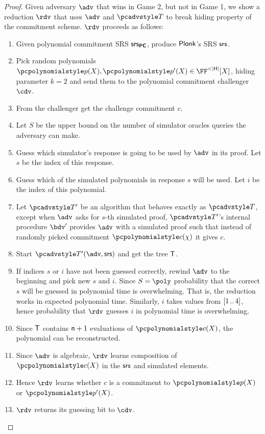 \documentclass[runningheads,11pt]{llncs}
\begin{document}
\begin{proof}
   Given adversary $\adv$ that wins in Game
  2, but not in Game 1, we show a reduction $\rdv$ that uses $\adv$ and $\tdv$
  to break hiding property  of the commitment scheme. $\rdv$ proceeds as follows:
  \begin{enumerate}
  \item Given polynomial commitment SRS $\mathsf{srs}_{\bm{\mathsf{PC}}}$, produce $\textnormal{\textsf{Plonk}}$'s SRS
    $\mathsf{srs}$.
  \item Pick random polynomials $\p{p} (X), \p{p'} (X) \in \FF^{< |\HHH|} [X]$,
    hiding parameter $k = 2$ and send them to the polynomial commitment
    challenger $\cdv$.
  \item From the challenger get the challenge commitment $c$.
  \item Let $S$ be the upper bound on the number of simulator oracles queries
    the adversary can make. 
  \item Guess which simulator's response is going to be used by $\adv$ in its
    proof. Let $s$ be the index of this response.
  \item Guess which of the simulated polynomials in response $s$ will be
    used. Let $i$ be the index of this polynomial.
  \item Let $\tdv'$ be an algorithm that behaves exactly as $\tdv$, except when
    $\adv$ asks for $s$-th simulated proof, $\tdv'$'s internal procedure $\bdv'$
    provides $\adv$ with a simulated proof such that instead of randomly picked
    commitment $\p{c} (\chi)$ it gives $c$.
  \item Start $\tdv'(\adv, \srs)$ and get the tree $\mathsf{T}$.
  \item If indices $s$ or $i$ have not been guessed correctly, rewind $\adv$ to
    the beginning and pick new $s$ and $i$. Since $S = \poly$ probability that
    the correct $s$ will be guessed in polynomial time is overwhelming. That is,
    the reduction works in expected polynomial time. Similarly, $i$ takes values
    from $[1 \, .. \, 4]$, hence probability that $\rdv$ guesses $i$ in polynomial
    time is overwhelming. 
  \item Since $\mathsf{T}$ contains $\mathsf{n} + 1$ evaluations of $\p{c} (X)$, the
    polynomial can be reconstructed. 
  \item Since $\adv$ is algebraic, $\rdv$ learns composition of $\p{c} (X)$ in
    the $\mathsf{srs}$ and simulated elements. 
  \item Hence $\rdv$ learns whether $c$ is a commitment to $\p{p} (X)$ or
    $\p{p'} (X)$.
  \item $\rdv$ returns its guessing bit to $\cdv$.
  \end{enumerate}


\end{proof}
\end{document}
